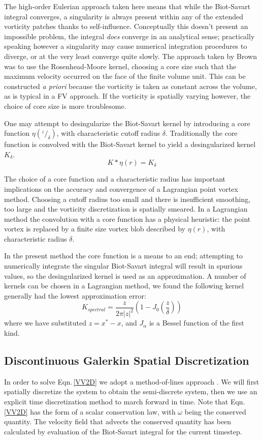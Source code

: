 \documentclass[]{aiaa-tc}%
\newcommand{\ben}[1]{\begin{equation}\label{#1}}
\newcommand{\ee}{\end{equation}}
\begin{document}
The high-order Eulerian approach taken here means that while the Biot-Savart integral converges, a singularity is always present within any of the extended vorticity patches thanks to self-influence. Conceptually this doesn't present an impossible problem, the integral \textit{does} converge in an analytical sense; practically speaking however a singularity may cause numerical integration procedures to diverge, or at the very least converge quite slowly. The approach taken by Brown \cite{Brown2004} was to use the Rosenhead-Moore kernel, choosing a core size such that the maximum velocity occurred on the face of the finite volume unit. This can be constructed \textit{a priori} because the vorticity is taken as constant across the volume, as is typical in a FV approach. If the vorticity is spatially varying however, the choice of core size is more troublesome.

One may attempt to desingularize the Biot-Savart kernel by introducing a core function $\eta(^z/_{\delta})$, with characteristic cutoff radius $\delta$. Traditionally the core function is convolved with the Biot-Savart kernel to yield a desingularized kernel $K_{\delta}$.
\ben{DesingBS} K*\eta(r) = K_{\delta} \ee

The choice of a core function and a characteristic radius has important implications on the accuracy and convergence of a Lagrangian point vortex method. Choosing a cutoff radius too small and there is insufficient smoothing, too large and the vorticity discretization is spatially smeared. In a Lagrangian method the convolution with a core function has a physical heuristic: the point vortex is replaced by a finite size vortex blob described by $\eta(r)$, with characteristic radius $\delta$. 

In the present method the core function is a means to an end; attempting to numerically integrate the singular Biot-Savart integral will result in spurious values, so the desingularized kernel is used as an approximation. A number of kernels can be chosen in a Lagrangian method, we found the following kernel\cite{WL} generally had the lowest approximation error:
\ben{PSkern0}  K_{spectral}= \frac{z}{2 \pi |z|^2} (1-J_0(\frac{z}{\delta})) \ee
where we have substituted $z=x^*-x$, and $J_\alpha$ is a Bessel function of the first kind.

\subsection{Discontinuous Galerkin Spatial Discretization}
In order to solve Eqn.\,\eqref{VV2D} we adopt a method-of-lines approach \cite{RKDG}. We will first spatially discretize the system to obtain the semi-discrete system, then we use an explicit time discretization method to march forward in time. Note that Eqn.\,\eqref{VV2D} has the form of a scalar conservation law, with $\omega$ being the conserved quantity. The velocity field that advects the conserved quantity has been calculated by evaluation of the Biot-Savart integral for the current timestep.
\end{document}

